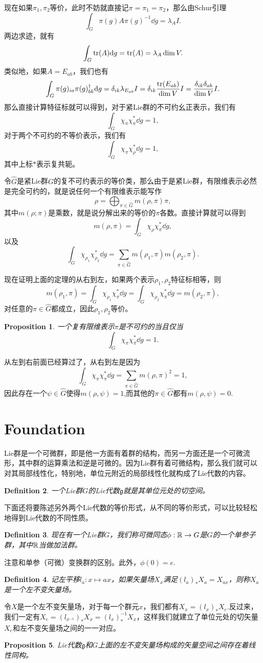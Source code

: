 \documentclass[8pt]{book}
\theoremstyle{plain}
\newtheorem{defi}{Definition}
\newtheorem{pro}[defi]{Proposition}
\newcommand{\lag}{{\mathfrak{g}}}  %
\begin{document}
现在如果$\pi_1,\pi_2$等价，此时不妨就直接记$\pi=\pi_1=\pi_2$，那么由Schur引理
\[
	\int_G \pi(g)A\pi(g)^{-1}\dd g=\lambda_A I.
\]
两边求迹，就有
\[
	\int_G \operatorname{tr}(A)\mathrm{d} g=\operatorname{tr}(A)=\lambda_A \dim V.
\]
类似地，如果$A=E_{ab}$，我们也有
\[
	\int_G \pi(g)_{ia}\pi(g)^{\dag}_{bk}\mathrm{d} g=\delta_{ik}\lambda_{E_{ab}} I=\delta_{ik}\frac{\operatorname{tr}(E_{ab})}{\dim V}I=\frac{\delta_{ik}\delta_{ab}}{\dim V}I.
\]
那么直接计算特征标就可以得到，对于紧Lie群的不可约幺正表示，我们有
\[
	\int_G \chi_\pi \chi_\pi^*\dd g=1,
\]
对于两个不可约的不等价表示，我们有
\[
	\int_G \chi_\pi \chi_\rho^*\dd g=1,
\]
其中上标$*$表示复共轭。

令$\hat{G}$是紧Lie群$G$的复不可约表示的等价类，那么由于是紧Lie群，有限维表示必然是完全可约的，就是说任何一个有限维表示能写作
\[
	\rho=\bigoplus_{\pi\in\hat{G}}m(\rho,\pi)\pi,
\]
其中$m(\rho;\pi)$是乘数，就是说分解出来的等价的$\pi$各数。直接计算就可以得到
\[
	m(\rho,\pi)=\int_G \chi_\rho \chi_\pi^*\dd g,
\]
以及
\[
	\int_G \chi_{\rho_1} \chi_{\rho_2}^*\dd g=\sum_{\pi\in\hat{G}}m(\rho_1,\pi)m(\rho_2,\pi).
\]

现在证明上面的定理的从右到左，如果两个表示$\rho_1,\rho_2$特征标相等，则
\[
	m(\rho_1,\pi)=\int_G \chi_{\rho_1} \chi_\pi^*\dd g=\int_G \chi_{\rho_2} \chi_\pi^*\dd g=m(\rho_2,\pi),
\]
对任意的$\pi\in\hat{G}$都成立，因此$\rho_1,\rho_2$等价。

\begin{pro}
一个复有限维表示$\pi$是不可约的当且仅当
\[
	\int_G \chi_{\pi} \chi_{\pi}^*\dd g=1.
\]
\end{pro}
从左到右前面已经算过了，从右到左是因为
\[
	\int_G \chi_{\pi} \chi_{\pi}^*\dd g=\sum_{\pi\in\hat{G}}m(\rho,\pi)^2=1,
\]
因此存在一个$\psi\in\hat{G}$使得$m(\rho,\psi)=1$,而其他的$\pi\in\hat{G}$都有$m(\rho,\psi)=0$.

\section{Foundation}
Lie群是一个可微群，即是他一方面有着群的结构，而另一方面还是一个可微流形，其中群的运算乘法和逆是可微的。因为Lie群有着可微结构，那么我们就可以对其局部线性化，特别地，单位元附近的局部线性化就构成了Lie代数的内容。

\begin{defi}
一个Lie群$G$的Lie代数$\lag$就是其单位元处的切空间。
\end{defi}
下面还将要陈述另外两个Lie代数的等价形式，从不同的等价形式，可以比较轻松地得到Lie代数的不同性质。
\begin{defi}
现在有一个Lie群$G$，我们称可微同态$\phi:\mathbb{R}\to G$是$G$的一个单参子群，其中$\mathbb{R}$当做加法群。
\end{defi}
注意和单参（可微）变换群的区别。此外，$\phi(0)=e$.
\begin{defi}记左平移$l_a:x\mapsto ax$，如果矢量场$X_x$满足$(l_a)_*X_a=X_{ax}$，则称$X_a$是一个左不变矢量场。
\end{defi}
令$X$是一个左不变矢量场，对于每一个群元$x$，我们都有$X_x=(l_x)_*X_e$.反过来，我们一定有$X_e=(l_{x^{-1}})_*X_x=(l_x)^{-1}_*X_x$，这样我们就建立了单位元处的切矢量$X_e$和左不变矢量场之间的一一对应。
\begin{pro}
Lie代数$\lag$和$G$上面的左不变矢量场构成的矢量空间之间存在着线性同构。
\end{pro}
\end{document}
